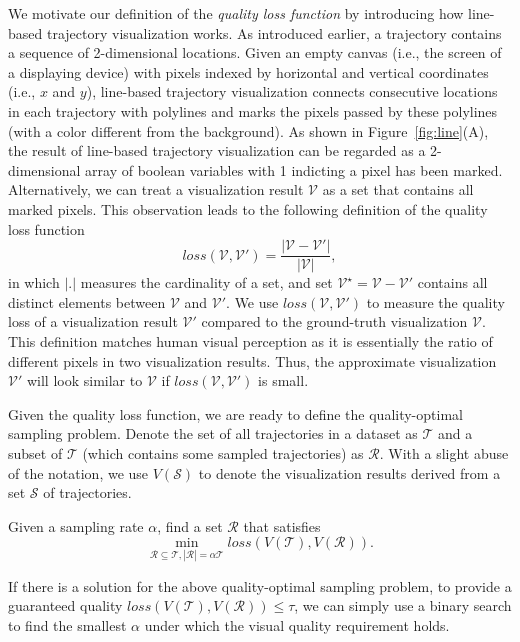 We motivate our definition of the \textit{quality loss function} by introducing how line-based trajectory visualization works. As introduced earlier, a trajectory contains a sequence of 2-dimensional locations. Given an empty canvas (i.e., the screen of a displaying device) with pixels indexed by horizontal and vertical coordinates (i.e., $x$ and $y$), line-based trajectory visualization connects consecutive locations in each trajectory with polylines and marks the pixels passed by these polylines (with a color different from the background). As shown in Figure~\ref{fig:line}(A), the result of line-based trajectory visualization can be regarded as a 2-dimensional array of boolean variables with 1 indicting a pixel has been marked. Alternatively, we can treat a visualization result $\mathcal{V}$ as a set that contains all marked pixels. This observation leads to the following definition of the quality loss function
\begin{equation}\label{eqref:loss}
loss(\mathcal{V}, \mathcal{V}')=\frac{|\mathcal{V}-\mathcal{V}'|}{|\mathcal{V}|},
\end{equation}
in which $|.|$ measures the cardinality of a set, and set $\mathcal{V}^\star=\mathcal{V}-\mathcal{V}'$ contains all distinct elements between $\mathcal{V}$ and $\mathcal{V}'$. We use $loss(\mathcal{V}, \mathcal{V}')$ to measure the quality loss of a visualization result $\mathcal{V}'$ compared to the ground-truth visualization $\mathcal{V}$. This definition matches human visual perception as it is essentially the ratio of different pixels in two visualization results. Thus, the approximate visualization $\mathcal{V}'$ will look similar to $\mathcal{V}$ if $loss(\mathcal{V}, \mathcal{V}')$ is small.


Given the quality loss function, we are ready to define the quality-optimal sampling problem. Denote the set of all trajectories in a dataset as $\mathcal{T}$ and a subset of $\mathcal{T}$ (which contains some sampled trajectories) as $\mathcal{R}$. With a slight abuse of the notation, we use $V(\mathcal{S})$ to denote the visualization results derived from a set $\mathcal{S}$ of trajectories.

\begin{problem}\label{prob:def}
	Given a sampling rate $\alpha$, find a set $\mathcal{R}$ that satisfies
	\begin{equation}\label{eq:opp}
	\min_{\mathcal{R} \subseteq \mathcal{T}, |\mathcal{R} | = \alpha \mathcal{T} } loss(V(\mathcal{T}), V(\mathcal{R})).
	\end{equation}
\end{problem}
If there is a solution for the above quality-optimal sampling problem, to provide a guaranteed quality $loss(V(\mathcal{T}), V(\mathcal{R}))\le \tau$, we can simply use a binary search to find the smallest $\alpha$ under which the visual quality requirement holds.

